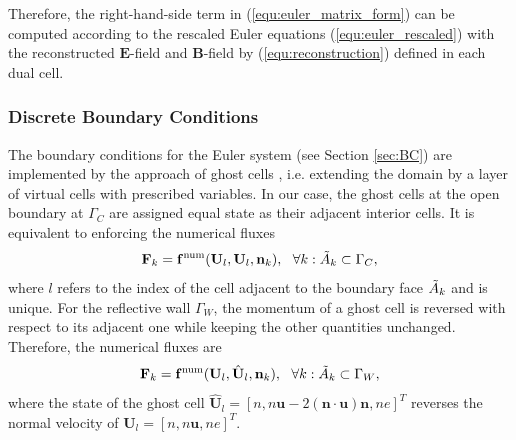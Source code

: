 \documentclass{article}
\begin{document}
Therefore, the right-hand-side term in (\ref{equ:euler_matrix_form}) can be computed according to the rescaled Euler equations (\ref{equ:euler_rescaled}) with the reconstructed $\mathbf{E}$-field and $\mathbf{B}$-field by (\ref{equ:reconstruction}) defined in each dual cell.

\subsubsection{Discrete Boundary Conditions}
The boundary conditions for the Euler system (see Section \ref{sec:BC}) are implemented by the approach of ghost cells \cite[][Ch. 7]{leveque_2007}, i.e. extending the domain by a layer of virtual cells with prescribed variables. In our case, the ghost cells at the open boundary at $\Gamma_C$ are assigned equal state as their adjacent interior cells. It is equivalent to enforcing the numerical fluxes
\begin{equation} \label{equ:discrete_open_bc}
    \mathbf{F}_k = {\mathbf{f}^\text{num}}(\mathbf{U}_l, \mathbf{U}_l, \mathbf{n}_k), \ \ \forall k: \Tilde{A}_k \subset \Gamma_C,
\end{equation}
where $l$ refers to the index of the cell adjacent to the boundary face $\Tilde{A}_k$ and is unique. For the reflective wall $\Gamma_W$, the momentum of a ghost cell is reversed with respect to its adjacent one while keeping the other quantities unchanged. Therefore, the numerical fluxes are 
\begin{equation} \label{equ:discrete_wall_bc}
    \mathbf{F}_k = \mathbf{f}^\text{num}(\mathbf{U}_l, \hat{\mathbf{U}}_l, \mathbf{n}_k), \ \ \forall k: \Tilde{A}_k \subset \Gamma_W,
\end{equation}
where the state of the ghost cell $\hat{\mathbf{U}}_l = [n, n\mathbf{u} - 2(\mathbf{n}\cdot\mathbf{u})\mathbf{n}, ne]^T$ reverses the normal velocity of $\mathbf{U}_l = [n, n\mathbf{u}, ne]^T$. 
\end{document}
